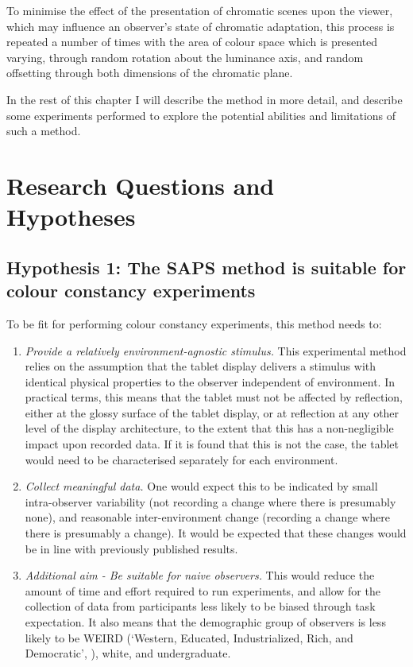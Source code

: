 To minimise the effect of the presentation of chromatic scenes upon the viewer, which may influence an observer's state of chromatic adaptation, this process is repeated a number of times with the area of colour space which is presented varying, through random rotation about the luminance axis, and random offsetting through both dimensions of the chromatic plane.

In the rest of this chapter I will describe the method in more detail, and describe some experiments performed to explore the potential abilities and limitations of such a method.

\section{Research Questions and Hypotheses} \label{sec:qandhyp}

\subsection*{Hypothesis 1: The \gls{SAPS} method is suitable for colour constancy experiments}

To be fit for performing colour constancy experiments, this method needs to:

\begin{enumerate}[label=\Alph*.]
    \item \label{list:hyp1a} \emph{Provide a relatively environment-agnostic stimulus.} 
    This experimental method relies on the assumption that the tablet display delivers a stimulus with identical physical properties to the observer independent of environment. In practical terms, this means that the tablet must not be affected by reflection, either at the glossy surface of the tablet display, or at reflection at any other level of the display architecture, to the extent that this has a non-negligible impact upon recorded data. If it is found that this is not the case, the tablet would need to be characterised separately for each environment.
    \item \label{list:hyp1b} \emph{Collect meaningful data.} 
    One would expect this to be indicated by small intra-observer variability (not recording a change where there is presumably none), and reasonable inter-environment change (recording a change where there is presumably a change). It would be expected that these changes would be in line with previously published results.
    \item \label{list:hyp1c} \emph{Additional aim - Be suitable for naive observers.}
    This would reduce the amount of time and effort required to run experiments, and allow for the collection of data from participants less likely to be biased through task expectation. It also means that the demographic group of observers is less likely to be 
    WEIRD (`Western, Educated, Industrialized, Rich, and Democratic', \citep{henrich_weirdest_2010,brookshire_social_2013,justsaysinweird_just_2019}), white, and undergraduate.
\end{enumerate}

